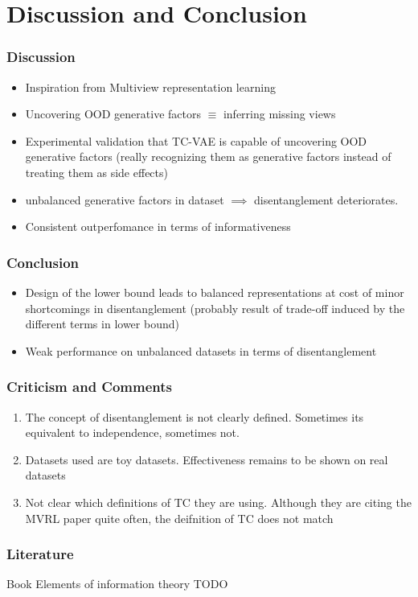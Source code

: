 \documentclass{beamer}
\theoremstyle{definition}
\begin{document}
    \section{Discussion and Conclusion}

    \begin{frame}
      \frametitle{Discussion}
      \begin{itemize}
        \item Inspiration from Multiview representation learning
        \item Uncovering OOD generative factors $\equiv$ inferring missing views
        \item Experimental validation that TC-VAE is capable of uncovering OOD generative factors (really recognizing them as generative factors instead of treating them as side effects)
        \item unbalanced generative factors in dataset $\implies$ disentanglement deteriorates.
        \item Consistent outperfomance in terms of informativeness
      \end{itemize}
    \end{frame}

    \begin{frame}
      \frametitle{Conclusion}
      \begin{itemize}
        \item Design of the lower bound leads to balanced representations at cost of minor shortcomings in disentanglement (probably result of trade-off induced by the different terms in lower bound)
        \item Weak performance on unbalanced datasets in terms of disentanglement
      \end{itemize}
    \end{frame}

    \begin{frame}
      \frametitle{Criticism and Comments}
      \begin{enumerate}
        \item The concept of disentanglement is not clearly defined. Sometimes its equivalent to independence, sometimes not.
        \item Datasets used are toy datasets. Effectiveness remains to be shown on real datasets
        \item Not clear which definitions of TC they are using. Although they are citing the MVRL paper quite often, the deifnition of TC does not match
      \end{enumerate}
    \end{frame}

    \begin{frame}
      \frametitle{Literature}
      Book Elements of information theory
      TODO
    \end{frame}


   
\end{document}
